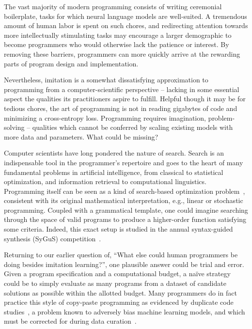 \documentclass[12pt]{article}
\begin{document}
The vast majority of modern programming consists of writing ceremonial boilerplate, tasks for which neural language models are well-suited. A tremendous amount of human labor is spent on such chores, and redirecting attention towards more intellectually stimulating tasks may encourage a larger demographic to become programmers who would otherwise lack the patience or interest. By removing these barriers, programmers can more quickly arrive at the rewarding parts of program design and implementation.

Nevertheless, imitation is a somewhat dissatisfying approximation to programming from a computer-scientific perspective -- lacking in some essential aspect the qualities its practitioners aspire to fulfill. Helpful though it may be for tedious chores, the art of programming is not in reading gigabytes of code and minimizing a cross-entropy loss. Programming requires imagination, problem-solving -- qualities which cannot be conferred by scaling existing models with more data and parameters. What could be missing?

Computer scientists have long pondered the nature of search. Search is an indispensable tool in the programmer's repertoire and goes to the heart of many fundamental problems in artificial intelligence, from classical to statistical optimization, and information retrieval to computational linguistics. Programming itself can be seen as a kind of search-based optimization problem~\cite{alur2018search}, consistent with its original mathematical interpretation, e.g., linear or stochastic programming. Coupled with a grammatical template, one could imagine searching through the space of valid programs to produce a higher-order function satisfying some criteria. Indeed, this exact setup is studied in the annual syntax-guided synthesis (SyGuS) competition~\cite{alur2016sygus}.

Returning to our earlier question of, ``What else could human programmers be doing besides imitation learning?'', one plausible answer could be trial and error. Given a program specification and a computational budget, a naïve strategy could be to simply evaluate as many programs from a dataset of candidate solutions as possible within the allotted budget. Many programmers do in fact practice this style of copy-paste programming as evidenced by duplicate code studies~\cite{lopes2017dejavu}, a problem known to adversely bias machine learning models, and which must be corrected for during data curation~\cite{allamanis2019adverse}.
\end{document}
